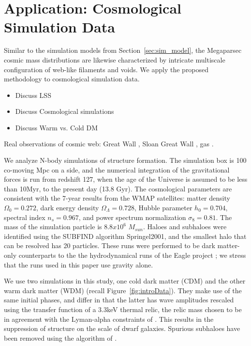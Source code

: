 \documentclass[12pt]{article}
\newcommand{\figref}[1]{Figure~\ref{#1}}
\begin{document}

\section{Application: Cosmological Simulation Data}
\label{sec:application}

Similar to the simulation models from Section~\ref{sec:sim_model}, the Megaparsec cosmic mass distributions are likewise characterized by intricate multiscale configuration of web-like filaments and voids.  We apply the proposed methodology to cosmological simulation data.

{\color{red}
\begin{itemize}
\item  Discuss LSS
\item  Discuss Cosmological simulations
\item  Discuss Warm vs. Cold DM
\end{itemize}
Real observations of cosmic web:  Great Wall \cite{geller1989mapping}, Sloan Great Wall \cite{gott2005map}, gas \cite{cantalupo2014cosmic}.}

We analyze N-body simulations of structure formation. The simulation box is 100 co-moving Mpc on a side, and the numerical integration of the gravitational forces is run from redshift 127, when the age of the Universe is assumed to be less than 10Myr, to the present day (13.8 Gyr). The cosmological parameters are consistent with the 7-year results from the WMAP satellites: matter density $\Omega_0 = 0.272$, dark energy density $\Omega_{\Lambda} = 0.728$, Hubble parameter $h_0 = 0.704$, spectral index $n_s=0.967$, and power spectrum normalization $\sigma_8=0.81$. The mass of the simulation particle is $8.8x10^6$ $M_{sun}$. Haloes and subhaloes were identified using the SUBFIND algorithm {\color{red} Springel2001}, and the smallest halo that can be resolved has 20 particles. These runs were performed to be dark matter-only counterparts to the the hydrodynamical runs of the Eagle project \cite{schaye2015eagle}; we stress that the runs used in this paper use gravity alone. 

We use two simulations in this study, one cold dark matter (CDM) and the other warm dark matter (WDM) (recall \figref{fig:introData}). They make use of the same initial phases, and differ in that the latter has wave amplitudes rescaled using the transfer function of a 3.3keV thermal relic, the relic mass chosen to be in agreement with the Lyman-alpha constraints of \cite{viel2013warm}. This results in the suppression of structure on the scale of dwarf galaxies. Spurious subhaloes have been removed using the algorithm of \cite{lovell2014properties}.
\end{document}
